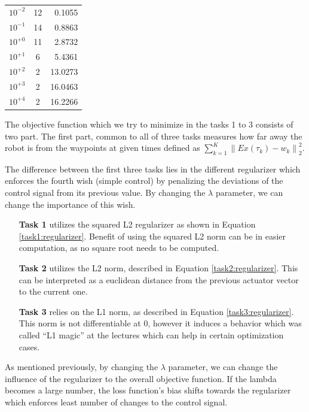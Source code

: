 \begin{table}[!htb]
\begin{minipage}{.33\linewidth}
\begin{tabular}{c|cr}
            $10^{-2}$ & 12 & 0.1055 \\
            $10^{-1}$ & 14 & 0.8863 \\
            $10^{+0} $ & 11 & 2.8732 \\
            $10^{+1} $ & 6 & 5.4361 \\
            $10^{+2} $ & 2 & 13.0273 \\
            $10^{+3} $ & 2 & 16.0463 \\
            $10^{+4} $ & 2 & 16.2266
        \end{tabular}
    \end{minipage} 
\end{table}

The objective function which we try to minimize in the tasks 1 to 3 consists of two part. The first part, common to all of three tasks measures how far away the robot is from the waypoints at given times defined as $\sum_{k = 1}^K \left\| E x( \tau_k ) - w_k \right\|_2^2$. 

The difference between the first three tasks lies in the different regularizer which enforces the fourth wish (simple control) by penalizing the deviations of the control signal from its previous value. By changing the $\lambda$ parameter, we can change the importance of this wish. 


\begin{itemize}
    \item[\textbf{Task 1}] utilizes the squared L2 regularizer as shown in Equation \ref{task1:regularizer}. Benefit of using the squared L2 norm can be in easier computation, as no square root needs to be computed.
    \item[\textbf{Task 2}] utilizes the L2 norm, described in Equation \ref{task2:regularizer}. This can be interpreted as a euclidean distance from the previous actuator vector to the current one.
    \item[\textbf{Task 3}] relies on the L1 norm, as described in Equation \ref{task3:regularizer}. This norm is not differentiable at 0, however it induces a behavior which was called ``L1 magic'' at the lectures which can help in certain optimization cases.
\end{itemize}

As mentioned previously, by changing the $\lambda$ parameter, we can change the influence of the regularizer to the overall objective function. If the lambda becomes a large number, the loss function's bias shifts towards the regularizer which enforces least number of changes to the control signal.

